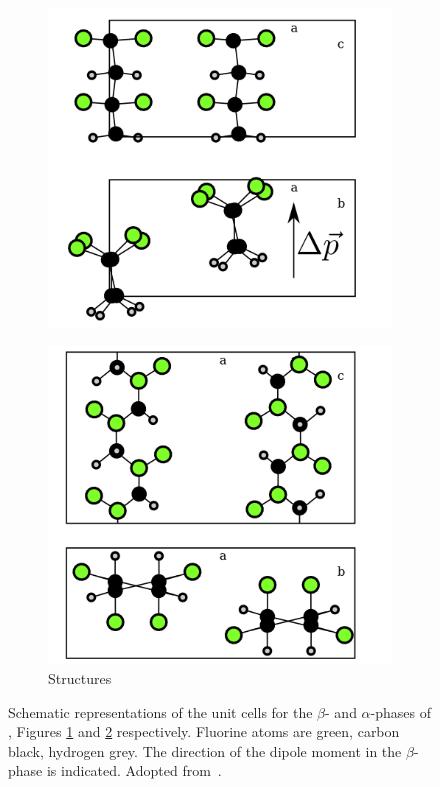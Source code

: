 \begin{figure}
\begin{subfigure}{0.5\textwidth}
\centering
	\includegraphics[width=0.8\linewidth]{./figs/chap1/betaunitcell}
	\caption{}
	\label{fig:betaunitcell}
\end{subfigure}
\begin{subfigure}{0.5\textwidth}
\centering
	\includegraphics[width=0.8\linewidth]{./figs/chap1/alphaunitcell}
	\caption{Structures}
	\label{fig:alphaunitcell}
\end{subfigure}
\caption{Schematic representations of the unit cells for the $\beta$- and $\alpha$-phases of \pvdf{}, Figures \ref{fig:betaunitcell} and \ref{fig:alphaunitcell} respectively. Fluorine atoms are green, carbon black, hydrogen grey. The direction of the dipole moment in the $\beta$-phase is indicated. Adopted from~\cite[pp. 809f]{encyclopedia}.}
\label{fig:pvdfunit}
\end{figure}
